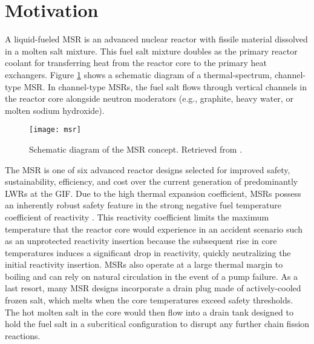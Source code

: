 \section{Motivation}

A liquid-fueled \gls{MSR} is an advanced nuclear reactor with fissile material
dissolved in a molten salt mixture. This fuel salt mixture doubles as the primary reactor coolant
for transferring heat from the reactor core to the primary heat exchangers. Figure \ref{fig:msr}
shows a schematic diagram of a thermal-spectrum, channel-type \gls{MSR}. In channel-type
\glspl{MSR}, the fuel salt flows through vertical channels in the reactor core alongside neutron
moderators (e.g., graphite, heavy water, or molten sodium hydroxide). 
%
\begin{figure}[htb!]
	\centering
	\texttt{[image: msr]}
	\caption{Schematic diagram of the \gls{MSR} concept. Retrieved from
	\cite{u.s._doe_nuclear_energy_research_advisory_committee_technology_2002}.}
	\label{fig:msr}
\end{figure}

The \gls{MSR} is one of six advanced reactor designs selected for improved safety, sustainability,
efficiency, and cost over the current generation of predominantly \glspl{LWR} at the \gls{GIF}.
Due to the high thermal expansion coefficient, \glspl{MSR} possess an inherently robust
safety feature in the strong negative fuel temperature coefficient of
reactivity \cite{elsheikh_safety_2013}. This reactivity coefficient limits the
maximum temperature that the reactor core would experience in an accident
scenario such as an unprotected reactivity insertion because the subsequent
rise in core temperatures induces a significant drop in reactivity,
quickly neutralizing the initial reactivity insertion. \glspl{MSR} also
operate at a large thermal margin to boiling and can rely on natural
circulation in the event of a pump failure. As a last resort, many \gls{MSR}
designs incorporate a drain plug made of actively-cooled frozen salt, which
melts when the core temperatures exceed safety thresholds. The hot molten salt
in the core would then flow into a drain tank designed to hold the fuel salt in
a subcritical configuration to disrupt any further chain fission reactions.

